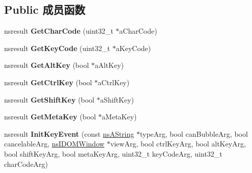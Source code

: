 \subsection*{Public 成员函数}
\begin{DoxyCompactItemize}
\item 
\mbox{\label{interfacens_i_d_o_m_key_event_a4b42844485776d32baa82d5e09ec1e54}} 
nsresult {\bfseries Get\+Char\+Code} (uint32\+\_\+t $\ast$a\+Char\+Code)
\item 
\mbox{\label{interfacens_i_d_o_m_key_event_a5787f9d49e278aedf53066ab494eb98b}} 
nsresult {\bfseries Get\+Key\+Code} (uint32\+\_\+t $\ast$a\+Key\+Code)
\item 
\mbox{\label{interfacens_i_d_o_m_key_event_ab1202f4f7fc6b3c544a5794403e4163e}} 
nsresult {\bfseries Get\+Alt\+Key} (bool $\ast$a\+Alt\+Key)
\item 
\mbox{\label{interfacens_i_d_o_m_key_event_af4c14a58e899bfefea01b74b5041efeb}} 
nsresult {\bfseries Get\+Ctrl\+Key} (bool $\ast$a\+Ctrl\+Key)
\item 
\mbox{\label{interfacens_i_d_o_m_key_event_acb34bc073e9bf6ecd37266e60f6eb38a}} 
nsresult {\bfseries Get\+Shift\+Key} (bool $\ast$a\+Shift\+Key)
\item 
\mbox{\label{interfacens_i_d_o_m_key_event_a77a3ef7004f15715e11a03367bc81144}} 
nsresult {\bfseries Get\+Meta\+Key} (bool $\ast$a\+Meta\+Key)
\item 
\mbox{\label{interfacens_i_d_o_m_key_event_ac78454284b1b3f27685262414690dd7e}} 
nsresult {\bfseries Init\+Key\+Event} (const \hyperlink{structns_string_container}{ns\+A\+String} $\ast$type\+Arg, bool can\+Bubble\+Arg, bool cancelable\+Arg, \hyperlink{interfacens_i_d_o_m_window}{ns\+I\+D\+O\+M\+Window} $\ast$view\+Arg, bool ctrl\+Key\+Arg, bool alt\+Key\+Arg, bool shift\+Key\+Arg, bool meta\+Key\+Arg, uint32\+\_\+t key\+Code\+Arg, uint32\+\_\+t char\+Code\+Arg)
\item 
\mbox{\label{interfacens_i_d_o_m_key_event_ae4e5bc986ef9ccd38769f6bb745cfb08}} 

\end{DoxyCompactItemize}
